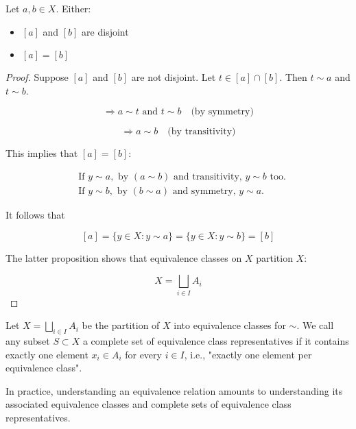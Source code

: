 \documentclass[11pt]{article}
\begin{document}
\begin{proposition}

    Let $a, b \in X$. Either:
    \begin{itemize}
        \item $[a]$ and $[b]$ are disjoint
        \item $[a] = [b]$
    \end{itemize}
\end{proposition}
\begin{proof} Suppose $[a]$ and $[b]$ are not disjoint. Let $t \in [a] \cap [b]$. Then $t \sim a$ and $t \sim b$.

    \[
        \Rightarrow a \sim t \text{ and } t \sim b \quad \text{(by symmetry)}
    \]

    \[
        \Rightarrow a \sim b \quad \text{(by transitivity)}
    \]

    This implies that $[a] = [b]$:

    \[
        \begin{aligned}
             & \text{If } y \sim a, \text{ by } (a \sim b) \text{ and transitivity, } y \sim b \text{ too.} \\
             & \text{If } y \sim b, \text{ by } (b \sim a) \text{ and symmetry, } y \sim a.
        \end{aligned}
    \]

    It follows that

    \[
        [a] = \{ y \in X : y \sim a \} = \{ y \in X : y \sim b \} = [b]
    \]

    The latter proposition shows that equivalence classes on $X$ partition $X$:

    \[
        X = \bigsqcup_{i \in I} A_i
    \]
\end{proof}
\begin{definition} Let $X = \bigsqcup_{i \in I} A_i$ be the partition of $X$ into equivalence classes for $\sim$. We call any subset $S \subset X$ a complete set of equivalence class representatives if it contains exactly one element $x_i \in A_i$ for every $i \in I$, i.e., "exactly one element per equivalence class".
\end{definition}

In practice, understanding an equivalence relation amounts to understanding its
associated equivalence classes and complete sets of equivalence class
representatives.
\end{document}
